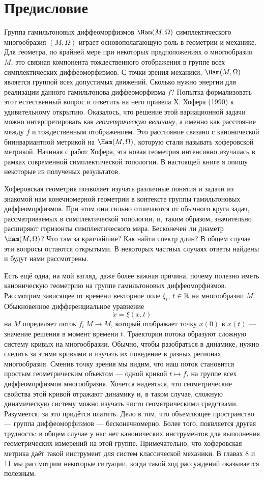 \chapter*{Предисловие}

Группа гамильтоновых диффеоморфизмов $\Ham(M,\Omega)$ симплектического
многообразия $(M,\Omega)$ играет
основополагающую роль в геометрии и
механике.
Для геометра, по крайней мере при некоторых предположениях
о многообразии $M$, это связная компонента тождественного отображения
в группе всех симплектических диффеоморфизмов.
С точки зрения
механики, $\Ham(M,\Omega)$ является группой всех допустимых движений.
Сколько нужно энергии для реализации данного гамильтонова диффеоморфизма $f$?
Попытка формализовать этот естественный вопрос и ответить на него привела Х. Хофера \cite{H1} (1990) к удивительному открытию.
Оказалось, что решение этой вариационной задачи можно интерпретировать как {}\emph{геометрическую величину}, а именно как расстояние между $f$ и тождественным
отображением.
Это расстояние связано с канонической биинвариантной метрикой на $\Ham(M,\Omega)$, которую стали называть хоферовской метрикой.
Начиная с работ Хофера, эта новая геометрия интенсивно изучалась в рамках современной
симплектической топологии.
В настоящей книге я опишу некоторые из полученых результатов.


Хоферовская геометрия позволяет изучать различные понятия и задачи из знакомой нам конечномерной геометрии в контексте группы гамильтоновых диффеоморфизмов.
При этом они сильно отличаются от обычного круга задач, рассматриваемых в симплектической топологии, и, таким образом, значительно расширяют горизонты симплектического мира.
Бесконечен ли диаметр $\Ham(M,\Omega)$?
Что там за кратчайшие?
Как найти спектр длин?
В общем случае эти вопросы остаются открытыми.
В некоторых частных случаях ответы найдены и будут нами рассмотрены.

Есть ещё одна, на мой взгляд, даже более важная причина, почему полезно иметь каноническую геометрию на группе гамильтоновых диффеоморфизмов.
Рассмотрим зависящее от времени векторное поле $\xi_t$, $t\in \mathbb{R}$ на многообразии $M$.
Обыкновенное дифференциальное уравнение
\[\dot x=\xi(x,t)\]
на $M$ определяет поток $f_t\: M \to M$, который отображает точку $x(0)$ в $x(t)$ — значение решения в момент времени $t$.
Траектории потока образуют сложную систему кривых на многообразии.
Обычно, чтобы разобраться в динамике, нужно следить за этими кривыми и изучать их поведение в разных регионах многообразия.
Сменив точку зрения мы видим, что наш поток становится простым
геометрическим объектом — одной кривой $t \mapsto f_t$ на группе всех диффеоморфизмов многообразия.
Хочется надеяться, что геометрические свойства этой кривой отражают динамику и, в таком случае, сложную динамическую систему можно изучать чисто геометрическими средствами. 
Разумеется, за это придётся платить.
Дело в том, что объемлющее пространство — группа
диффеоморфизмов — бесконечномерно.
Более того, появляется другая трудность:
в общем случае у нас нет канонических инструментов для выполнения геометрических измерений на этой группе.
Примечательно, что хоферовская метрика даёт такой инструмент для систем классической механики.
В главах 8 и 11 мы рассмотрим некоторые ситуации,
когда такой ход рассуждений оказывается полезным.

